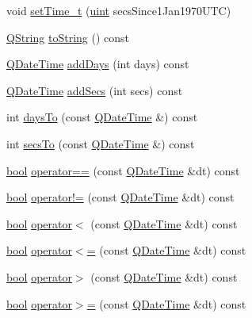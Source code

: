 \begin{DoxyCompactItemize}
void \hyperlink{class_q_date_time_a889dac98cb29b4b9f33cfea6f00db98b}{set\+Time\+\_\+t} (\hyperlink{qglobal_8h_a4d3943ddea65db7163a58e6c7e8df95a}{uint} secs\+Since1\+Jan1970\+U\+T\+C)
\item 
\hyperlink{class_q_string}{Q\+String} \hyperlink{class_q_date_time_a94679260f33e0d65e3a19a25faac3f3e}{to\+String} () const 
\item 
\hyperlink{class_q_date_time}{Q\+Date\+Time} \hyperlink{class_q_date_time_ac8d71dca1d69a86e7f0a4965d3443e2b}{add\+Days} (int days) const 
\item 
\hyperlink{class_q_date_time}{Q\+Date\+Time} \hyperlink{class_q_date_time_ab41453f42ca07e671b7947e2b74be80f}{add\+Secs} (int secs) const 
\item 
int \hyperlink{class_q_date_time_a46e208b15c11fee6281010fb391dfb42}{days\+To} (const \hyperlink{class_q_date_time}{Q\+Date\+Time} \&) const 
\item 
int \hyperlink{class_q_date_time_a5b0a280427ab6f784c11c26b5e380569}{secs\+To} (const \hyperlink{class_q_date_time}{Q\+Date\+Time} \&) const 
\item 
\hyperlink{qglobal_8h_a1062901a7428fdd9c7f180f5e01ea056}{bool} \hyperlink{class_q_date_time_a75f9a041d801b82d4067bd8dca9856e2}{operator==} (const \hyperlink{class_q_date_time}{Q\+Date\+Time} \&dt) const 
\item 
\hyperlink{qglobal_8h_a1062901a7428fdd9c7f180f5e01ea056}{bool} \hyperlink{class_q_date_time_a60e574149a64d13245b064e64882b654}{operator!=} (const \hyperlink{class_q_date_time}{Q\+Date\+Time} \&dt) const 
\item 
\hyperlink{qglobal_8h_a1062901a7428fdd9c7f180f5e01ea056}{bool} \hyperlink{class_q_date_time_a693ab035d206472677a44f834bf81f09}{operator$<$} (const \hyperlink{class_q_date_time}{Q\+Date\+Time} \&dt) const 
\item 
\hyperlink{qglobal_8h_a1062901a7428fdd9c7f180f5e01ea056}{bool} \hyperlink{class_q_date_time_ace6d2c88cd0455319bd517114a18cbbe}{operator$<$=} (const \hyperlink{class_q_date_time}{Q\+Date\+Time} \&dt) const 
\item 
\hyperlink{qglobal_8h_a1062901a7428fdd9c7f180f5e01ea056}{bool} \hyperlink{class_q_date_time_a062fe9d4b35fad8b065c2f48a034ec30}{operator$>$} (const \hyperlink{class_q_date_time}{Q\+Date\+Time} \&dt) const 
\item 
\hyperlink{qglobal_8h_a1062901a7428fdd9c7f180f5e01ea056}{bool} \hyperlink{class_q_date_time_adced96f63b3c95b1eed4e4145b3cb11b}{operator$>$=} (const \hyperlink{class_q_date_time}{Q\+Date\+Time} \&dt) const 
\end{DoxyCompactItemize}
